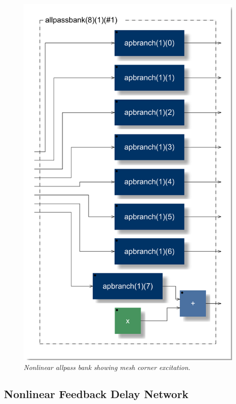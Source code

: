 \documentclass[twoside,a4paper]{article}
\begin{document}
\begin{figure}[ht]
\centerline{\includegraphics[scale=0.33]{fig/allpassbank.pdf}}
\caption{\label{allpassbank}{\it Nonlinear allpass bank showing mesh corner
    excitation.}}
\end{figure}

\subsection{Nonlinear Feedback Delay Network}
\end{document}
